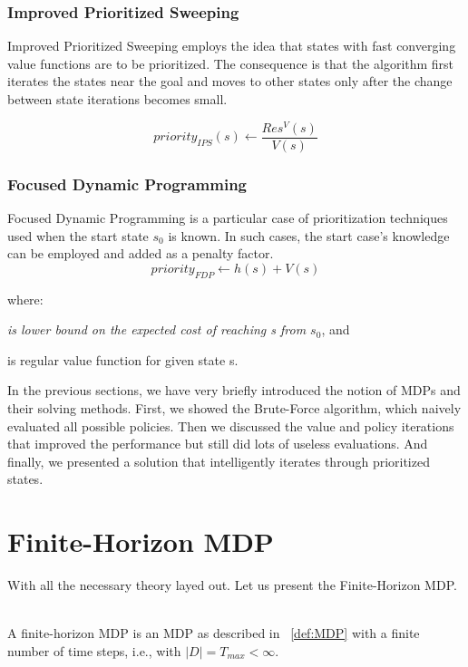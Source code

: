 \subsubsection{Improved Prioritized Sweeping}

Improved Prioritized Sweeping employs the idea that states with fast converging value functions are to be prioritized. The consequence is that the algorithm first iterates the states near the goal and moves to other states only after the change between state iterations becomes small.

$$priority_{IPS} (s) \xleftarrow{} \frac{Res^{V} (s)}{V (s)} $$

\subsubsection{Focused Dynamic Programming}

Focused Dynamic Programming is a particular case of prioritization techniques used when the start state $s_0$ is known. In such cases, the start case's knowledge can be employed and added as a penalty factor.
\newpage
$$priority_{FDP} \xleftarrow{} h(s) + V(s)$$


where:
\begin{description}[1cm]
  \item[h(s)] \textit{is lower bound on the expected cost of reaching s from $s_0$}, and
  \item[V(s)] is regular value function for given state s.
\end{description}

In the previous sections, we have very briefly introduced the notion of MDPs and their solving methods. First, we showed the Brute-Force algorithm, which naively evaluated all possible policies. Then we discussed the value and policy iterations that improved the performance but still did lots of useless evaluations. And finally, we presented a solution that intelligently iterates through prioritized states. 

\section{Finite-Horizon MDP}

With all the necessary theory layed out. Let us present the Finite-Horizon MDP.\\ \\

\begin{definition}
A finite-horizon MDP is an MDP as described in ~\ref{def:MDP} with a finite number of time steps, i.e., with $|D| = T_{max} < \infty$.
\end{definition}


